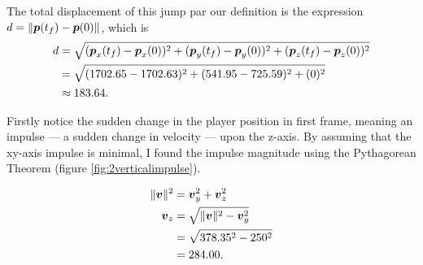 The total displacement of this jump par our definition is the expression $d = \|\boldsymbol{p}(t_f) - \boldsymbol{p}(0)\|$, which is
\begin{align*}
    d &= \sqrt{(\boldsymbol{p}_x(t_f) - \boldsymbol{p}_x(0))^2 + (\boldsymbol{p}_y(t_f) - \boldsymbol{p}_y(0))^2 + (\boldsymbol{p}_z(t_f) - \boldsymbol{p}_z(0))^2}\\
    &= \sqrt{(1702.65-1702.63)^2 + (541.95-725.59)^2 + (0)^2}\\
    &\approx 183.64.
\end{align*}

Firstly notice the sudden change in the player position in first frame, meaning an impulse --- a sudden change in velocity --- upon the z-axis. By assuming that the xy-axis impulse is minimal, I found the impulse magnitude using the Pythagorean Theorem (figure \ref{fig:2verticalimpulse}).

\begin{align*}
    \|\boldsymbol{v}\|^2 &= \boldsymbol{v}_y^2 + \boldsymbol{v}_z^2\\
    \boldsymbol{v}_z &= \sqrt{\|\boldsymbol{v}\|^2 - \boldsymbol{v}_y^2}\\
    &= \sqrt{378.35^2 -250^2}\\
    &= 284.00.
\end{align*}


